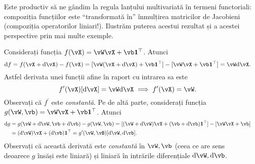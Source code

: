 \documentclass[../../book-main_ro.tex]{subfiles}
\begin{document}
Este productiv să ne gândim la regula lanțului multivariată în termeni functoriali: compoziția funcțiilor este ``transformată în'' înmulțirea matricilor de Jacobieni (compoziția operatorilor liniari!).
Ilustrăm puterea acestui rezultat și a acestei perspective prin mai multe exemple.

\begin{example}
    Considerați funcția \(f(\vX) = \vW\vX + \vb\vone^{\top}\). Atunci
    \begin{equation}
        \odif{f} = f(\vX + \odif{\vX}) - f(\vX) = [\vW(\vX + \odif{\vX}) + \vb\vone^{\top}] - [\vW \vX + \vb \vone^{\top}] = \vW\odif{\vX}.
    \end{equation}
    Astfel derivata unei funcții afine în raport cu intrarea sa este
    \begin{equation}
        f^{\prime}(\vX)[\odif{\vX}] = \vW\odif{\vX} \implies f^{\prime}(\vX) = \vW.
    \end{equation}
    Observați că \(f^{\prime}\) este \textit{constantă}. Pe de altă parte, considerați funcția \(g(\vW, \vb) = \vW\vX + \vb\vone^{\top}\). Atunci
    \begin{align}
        \odif{g} 
        &= g(\vW + \odif{\vW}, \vb + \odif{\vb}) - g(\vW, \vb) = [(\vW + \odif{\vW})\vX + (\vb + \odif{\vb})\vone^{\top}] - [\vW\vX + \vb] \\
        &= (\odif{\vW})\vX + (\odif{\vb})\vone^{\top} = g^{\prime}(\vW, \vB)[\odif{\vW}, \odif{\vb}].
    \end{align}
    Observați că această derivată este \textit{constantă} în \(\vW, \vb\) (ceea ce are sens deoarece \(g\) însăși este liniară) și liniară în intrările diferențiale \(\odif{\vW}, \odif{\vb}\).
\end{example}
\end{document}
